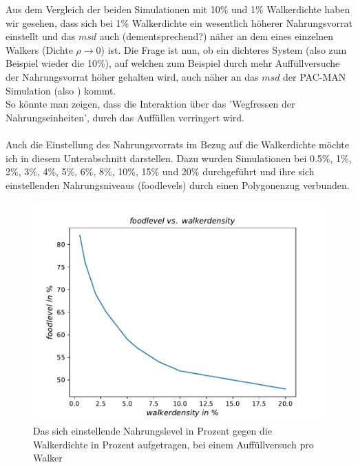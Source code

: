 \documentclass[a4paper, 12pt]{report}
\begin{document}
Aus dem Vergleich der beiden Simulationen mit 10\% und 1\% Walkerdichte haben wir gesehen, dass sich bei 1\% Walkerdichte ein wesentlich höherer Nahrungsvorrat einstellt und das $msd$ auch (dementsprechend?) näher an dem eines einzelnen Walkers (Dichte $\rho \rightarrow 0$) ist. Die Frage ist nun, ob ein dichteres System (also zum Beispiel wieder die 10\%), auf welchen zum Beispiel durch mehr Auffüllversuche der Nahrungsvorrat höher gehalten wird, auch näher an das $msd$ der PAC-MAN Simulation (also \cite{doi:10.1063/1.4999485}) kommt.
\\
So könnte man zeigen, dass die Interaktion über das 'Wegfressen der Nahrungseinheiten', durch das Auffüllen verringert wird.
\\
\\
Auch die Einstellung des Nahrungsvorrats im Bezug auf die Walkerdichte möchte ich in diesem Unterabschnitt darstellen. Dazu wurden Simulationen bei 0.5\%, 1\%, 2\%, 3\%, 4\%, 5\%, 6\%, 8\%, 10\%, 15\% und 20\% durchgeführt und ihre sich einstellenden Nahrungsniveaus (foodlevels) durch einen Polygonenzug verbunden.

\begin{figure}[H]
	\centering
	\includegraphics[scale=0.75]{flevel_vs_dens.pdf}
	\caption{Das sich einstellende Nahrungslevel in Prozent gegen die Walkerdichte in Prozent aufgetragen, bei einem Auffüllversuch pro Walker\label{foodlevel_vs_dens}}
\end{figure}

\clearpage
\end{document}
